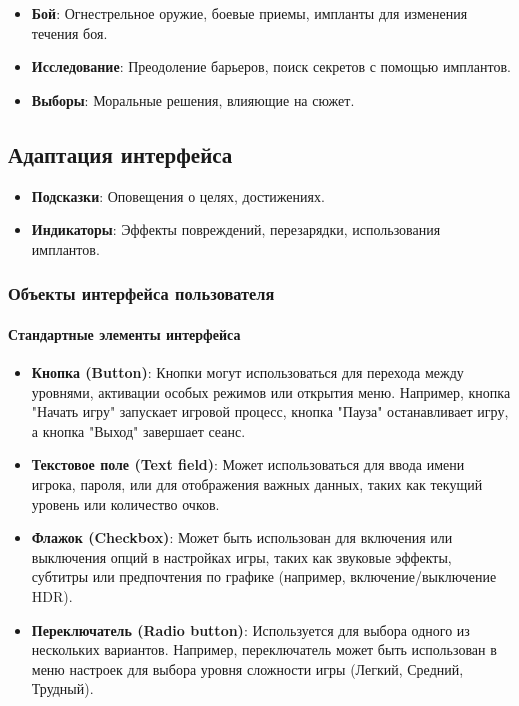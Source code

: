 \documentclass{article}
\begin{document}
\begin{itemize}
\begin{itemize}
  \item \textbf{Бой}: Огнестрельное оружие, боевые приемы, импланты для изменения течения боя.
  \item \textbf{Исследование}: Преодоление барьеров, поиск секретов с помощью имплантов.
  \item \textbf{Выборы}: Моральные решения, влияющие на сюжет.
\end{itemize}

\subsection{Адаптация интерфейса}

\begin{itemize}
  \item \textbf{Подсказки}: Оповещения о целях, достижениях.
  \item \textbf{Индикаторы}: Эффекты повреждений, перезарядки, использования имплантов.
\end{itemize}


\subsubsection{Объекты интерфейса пользователя}

\paragraph{Стандартные элементы интерфейса}
\begin{itemize}
    \item \textbf{Кнопка (Button)}: Кнопки могут использоваться для перехода между уровнями, активации особых режимов или открытия меню. Например, кнопка "Начать игру" запускает игровой процесс, кнопка "Пауза" останавливает игру, а кнопка "Выход" завершает сеанс.
    
    \item \textbf{Текстовое поле (Text field)}: Может использоваться для ввода имени игрока, пароля, или для отображения важных данных, таких как текущий уровень или количество очков.
    
    \item \textbf{Флажок (Checkbox)}: Может быть использован для включения или выключения опций в настройках игры, таких как звуковые эффекты, субтитры или предпочтения по графике (например, включение/выключение HDR).
    
    \item \textbf{Переключатель (Radio button)}: Используется для выбора одного из нескольких вариантов. Например, переключатель может быть использован в меню настроек для выбора уровня сложности игры (Легкий, Средний, Трудный).
    

\end{itemize}
\end{itemize}
\end{document}
